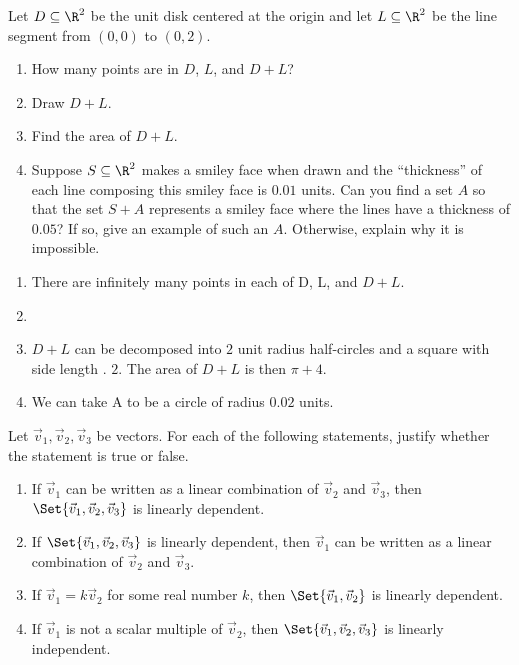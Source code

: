 \begin{exercises}
\begin{problist}
		\prob Let $D\subseteq\R^2$ be the unit disk centered at the origin and let $L\subseteq \R^2$ be
		the line segment from $(0,0)$ to $(0,2)$.
		\begin{enumerate}
			\item How many points are in $D$, $L$, and $D+L$?
			\item Draw $D+L$.
			\item Find the area of $D+L$.
			\item Suppose $S\subseteq\R^2$ makes a smiley face when drawn and the ``thickness'' of
			each line composing this smiley face is $0.01$ units. Can you find a set $A$ so
			that the set $S+A$ represents a smiley face where the lines have a thickness of $0.05$?
			If so, give an example of such an $A$. Otherwise, explain why it is impossible.
		\end{enumerate}
		\begin{solution}
			\begin{enumerate}
				\item There are infinitely many points in each of D, L, and $D+L$.
				\item %
				\item $D+L$ can be decomposed into $2$ unit radius half-circles and a square with side length .
				$2$. The area of $D+L$ is then $\pi+4$.
				\item We can take A to be a circle of radius $0.02$ units.
			\end{enumerate}
		\end{solution}
		
		\prob Let $\vec v_{1}, \vec v_{2}, \vec v_{3}$ be vectors. For each of the following statements,
		justify whether the statement is true or false.
		\begin{enumerate}
			\item If $\vec v_{1}$ can be written as a linear combination
			of $\vec v_{2}$ and $\vec v_{3}$, then $\Set{\vec
				v_1,\vec v_2,\vec v_3}$ is linearly dependent.
			
			\item If $\Set{\vec v_1,\vec v_2,\vec v_3}$ is linearly dependent,
			then $\vec v_{1}$ can be written as a linear combination
			of $\vec v_{2}$ and $\vec v_{3}$.
			
			\item If $\vec v_{1}=k\vec v_{2}$ for some real number $k$,
			then $\Set{\vec v_1,\vec v_2}$ is linearly dependent.
			
			\item If $\vec v_{1}$ is not a scalar multiple of $\vec
			v_{2}$, then $\Set{\vec v_1,\vec v_2,\vec v_3}$ is
			linearly independent.
			

\end{enumerate}
\end{problist}
\end{exercises}
